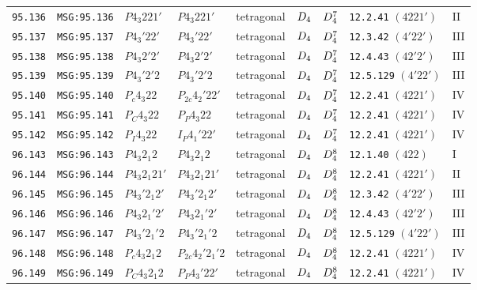 \documentclass[fleqn,10pt]{jsarticle}
\begin{document}
\begin{center}
\begin{longtable}{lllllllll}
\texttt{95.136} & \texttt{MSG:95.136} & $P4_{3}221'$ & $P4_{3}221'$ & tetragonal & $D_{\rm 4}$ & $D_{\rm 4}^{7}$ & \texttt{12.2.41} $(4221')$ & II \\
\texttt{95.137} & \texttt{MSG:95.137} & $P4_{3}'22'$ & $P4_{3}'22'$ & tetragonal & $D_{\rm 4}$ & $D_{\rm 4}^{7}$ & \texttt{12.3.42} $(4'22')$ & III \\
\texttt{95.138} & \texttt{MSG:95.138} & $P4_{3}2'2'$ & $P4_{3}2'2'$ & tetragonal & $D_{\rm 4}$ & $D_{\rm 4}^{7}$ & \texttt{12.4.43} $(42'2')$ & III \\
\texttt{95.139} & \texttt{MSG:95.139} & $P4_{3}'2'2$ & $P4_{3}'2'2$ & tetragonal & $D_{\rm 4}$ & $D_{\rm 4}^{7}$ & \texttt{12.5.129} $(4'22')$ & III \\
\texttt{95.140} & \texttt{MSG:95.140} & $P_{c}4_{3}22$ & $P_{2c}4_{2}'22'$ & tetragonal & $D_{\rm 4}$ & $D_{\rm 4}^{7}$ & \texttt{12.2.41} $(4221')$ & IV \\
\texttt{95.141} & \texttt{MSG:95.141} & $P_{C}4_{3}22$ & $P_{P}4_{3}22$ & tetragonal & $D_{\rm 4}$ & $D_{\rm 4}^{7}$ & \texttt{12.2.41} $(4221')$ & IV \\
\texttt{95.142} & \texttt{MSG:95.142} & $P_{I}4_{3}22$ & $I_{P}4_{1}'22'$ & tetragonal & $D_{\rm 4}$ & $D_{\rm 4}^{7}$ & \texttt{12.2.41} $(4221')$ & IV \\ \hline
\texttt{96.143} & \texttt{MSG:96.143} & $P4_{3}2_{1}2$ & $P4_{3}2_{1}2$ & tetragonal & $D_{\rm 4}$ & $D_{\rm 4}^{8}$ & \texttt{12.1.40} $(422)$ & I \\
\texttt{96.144} & \texttt{MSG:96.144} & $P4_{3}2_{1}21'$ & $P4_{3}2_{1}21'$ & tetragonal & $D_{\rm 4}$ & $D_{\rm 4}^{8}$ & \texttt{12.2.41} $(4221')$ & II \\
\texttt{96.145} & \texttt{MSG:96.145} & $P4_{3}'2_{1}2'$ & $P4_{3}'2_{1}2'$ & tetragonal & $D_{\rm 4}$ & $D_{\rm 4}^{8}$ & \texttt{12.3.42} $(4'22')$ & III \\
\texttt{96.146} & \texttt{MSG:96.146} & $P4_{3}2_{1}'2'$ & $P4_{3}2_{1}'2'$ & tetragonal & $D_{\rm 4}$ & $D_{\rm 4}^{8}$ & \texttt{12.4.43} $(42'2')$ & III \\
\texttt{96.147} & \texttt{MSG:96.147} & $P4_{3}'2_{1}'2$ & $P4_{3}'2_{1}'2$ & tetragonal & $D_{\rm 4}$ & $D_{\rm 4}^{8}$ & \texttt{12.5.129} $(4'22')$ & III \\
\texttt{96.148} & \texttt{MSG:96.148} & $P_{c}4_{3}2_{1}2$ & $P_{2c}4_{2}'2_{1}'2$ & tetragonal & $D_{\rm 4}$ & $D_{\rm 4}^{8}$ & \texttt{12.2.41} $(4221')$ & IV \\
\texttt{96.149} & \texttt{MSG:96.149} & $P_{C}4_{3}2_{1}2$ & $P_{P}4_{3}'22'$ & tetragonal & $D_{\rm 4}$ & $D_{\rm 4}^{8}$ & \texttt{12.2.41} $(4221')$ & IV \\

\end{longtable}
\end{center}
\end{document}
